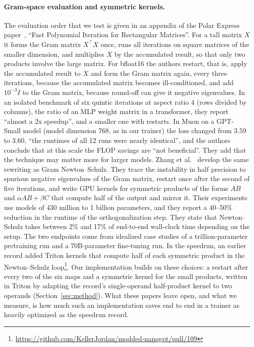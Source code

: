 \documentclass{article}
\begin{document}
\paragraph{Gram-space evaluation and symmetric kernels.} The evaluation order that we test is given in an appendix of the Polar Express paper~\cite{polar}, ``Fast Polynomial Iteration for Rectangular Matrices''. For a tall matrix $X$ it forms the Gram matrix $X^\top X$ once, runs all iterations on square matrices of the smaller dimension, and multiplies $X$ by the accumulated result, so that only two products involve the large matrix. For bfloat16 the authors restart, that is, apply the accumulated result to $X$ and form the Gram matrix again, every three iterations, because the accumulated matrix becomes ill-conditioned, and add $10^{-3}I$ to the Gram matrix, because round-off can give it negative eigenvalues. In an isolated benchmark of six quintic iterations at aspect ratio 4 (rows divided by columns), the ratio of an MLP weight matrix in a transformer, they report ``almost a 2x speedup'', and a smaller one with restarts. In Muon on a GPT-Small model (model dimension 768, as in our trainer) the loss changed from $3.59$ to $3.60$, ``the runtimes of all 12 runs were nearly identical'', and the authors conclude that at this scale the FLOP savings are ``not beneficial''. They add that the technique may matter more for larger models. Zhang et al.~\cite{gramns} develop the same rewriting as Gram Newton--Schulz. They trace the instability in half precision to spurious negative eigenvalues of the Gram matrix, restart once after the second of five iterations, and write GPU kernels for symmetric products of the forms $AB$ and $\alpha AB+\beta C$ that compute half of the output and mirror it. Their experiments use models of 430 million to 1 billion parameters, and they report a 40--50\% reduction in the runtime of the orthogonalization step. They state that Newton--Schulz takes between 2\% and 17\% of end-to-end wall-clock time depending on the setup. The two endpoints come from idealized case studies of a trillion-parameter pretraining run and a 70B-parameter fine-tuning run. In the speedrun, an earlier record added Triton kernels that compute half of each symmetric product in the Newton--Schulz loop\footnote{\url{https://github.com/KellerJordan/modded-nanogpt/pull/109}}. Our implementation builds on these choices: a restart after every two of the six maps and a symmetric kernel for the small products, written in Triton by adapting the record's single-operand half-product kernel to two operands (Section~\ref{sec:method}). What these papers leave open, and what we measure, is how much such an implementation saves end to end in a trainer as heavily optimized as the speedrun record.
\end{document}
